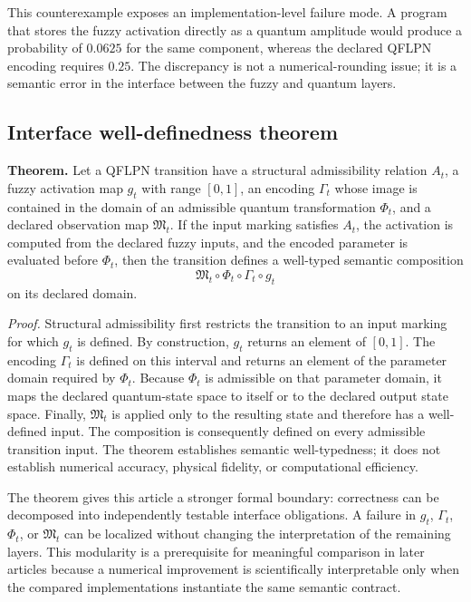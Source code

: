 \documentclass[final,3p,times]{elsarticle}
\begin{document}
This counterexample exposes an implementation-level failure mode. A program that stores the fuzzy activation directly as a quantum amplitude would produce a probability of $0.0625$ for the same component, whereas the declared QFLPN encoding requires $0.25$. The discrepancy is not a numerical-rounding issue; it is a semantic error in the interface between the fuzzy and quantum layers.

\subsection{Interface well-definedness theorem}

\textbf{Theorem.} Let a QFLPN transition have a structural admissibility relation $A_t$, a fuzzy activation map $g_t$ with range $[0,1]$, an encoding $\Gamma_t$ whose image is contained in the domain of an admissible quantum transformation $\Phi_t$, and a declared observation map $\mathfrak{M}_t$. If the input marking satisfies $A_t$, the activation is computed from the declared fuzzy inputs, and the encoded parameter is evaluated before $\Phi_t$, then the transition defines a well-typed semantic composition
\begin{equation}
    \mathfrak{M}_t \circ \Phi_t \circ \Gamma_t \circ g_t
\end{equation}
on its declared domain.

\textit{Proof.} Structural admissibility first restricts the transition to an input marking for which $g_t$ is defined. By construction, $g_t$ returns an element of $[0,1]$. The encoding $\Gamma_t$ is defined on this interval and returns an element of the parameter domain required by $\Phi_t$. Because $\Phi_t$ is admissible on that parameter domain, it maps the declared quantum-state space to itself or to the declared output state space. Finally, $\mathfrak{M}_t$ is applied only to the resulting state and therefore has a well-defined input. The composition is consequently defined on every admissible transition input. The theorem establishes semantic well-typedness; it does not establish numerical accuracy, physical fidelity, or computational efficiency.

The theorem gives this article a stronger formal boundary: correctness can be decomposed into independently testable interface obligations. A failure in $g_t$, $\Gamma_t$, $\Phi_t$, or $\mathfrak{M}_t$ can be localized without changing the interpretation of the remaining layers. This modularity is a prerequisite for meaningful comparison in later articles because a numerical improvement is scientifically interpretable only when the compared implementations instantiate the same semantic contract.
\end{document}
